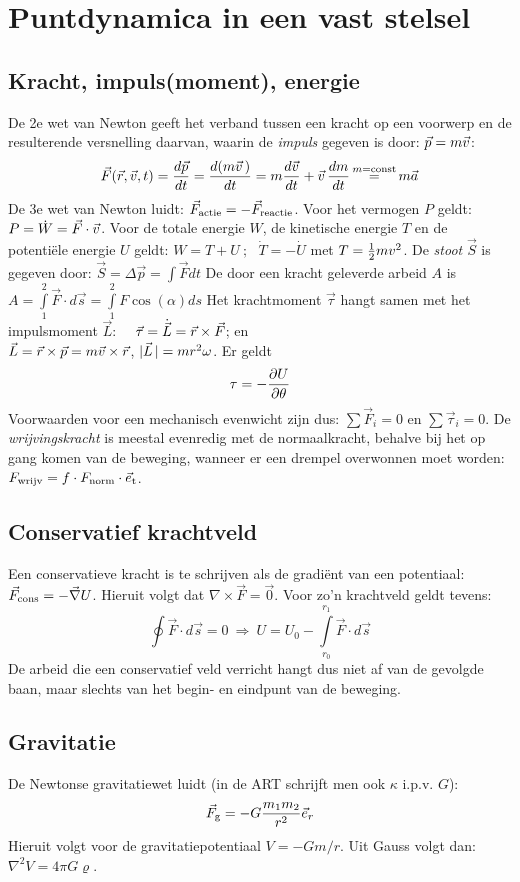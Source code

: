 \section{Puntdynamica in een vast stelsel}
\subsection{Kracht, impuls(moment), energie}
De 2e wet van Newton geeft het verband tussen een kracht op een voorwerp en
de resulterende versnelling daarvan, waarin de {\it impuls} gegeven is door:
$\vec{p}=m\vec{v}$:
\[
\vec{F}(\vec{r},\vec{v},t)=\frac{d\vec{p}}{dt}=\frac{d(m\vec{v}\,)}{dt}=m\frac{d\vec{v}}{dt}+
\vec{v}\,\frac{dm}{dt}\mathop{=}\limits^{m={\rm const}}m\vec{a}
\]
De 3e wet van Newton luidt: $\vec{F}_{\rm actie}=-\vec{F}_{\rm reactie}$.
\npar
Voor het vermogen $P$ geldt: $P=\dot{W}=\vec{F}\cdot\vec{v}$. Voor de totale
energie $W$, de kinetische energie $T$ en de potenti\"ele energie $U$ geldt:
$W=T+U~;~~~\dot{T}=-\dot{U}$ met $T=\mbox{$\frac{1}{2}$} mv^2$.
\npar
De {\it stoot} $\vec{S}$ is gegeven door:
$\displaystyle\vec{S}=\Delta\vec{p}=\int\vec{F}dt$
\npar
De door een kracht geleverde arbeid $A$ is
$\displaystyle A=\int\limits_1^2\vec{F}\cdot d\vec{s}=\int\limits_1^2F\cos(\alpha)ds$
\npar
Het krachtmoment $\vec{\tau}$ hangt samen met het impulsmoment $\vec{L}$:~~
$\vec{\tau}=\dot{\vec{L}}=\vec{r}\times\vec{F}$; en\\
$\vec{L}=\vec{r}\times\vec{p}=m\vec{v}\times\vec{r}$, $|\vec{L}\,|=mr^2\omega$. Er geldt
\[
\tau=-\frac{\partial U}{\partial \theta}
\]
Voorwaarden voor een mechanisch evenwicht zijn dus: $\sum\vec{F}_i=0$ en
$\sum\vec{\tau}_i=0$.
\npar
De {\it wrijvingskracht} is meestal evenredig met de normaalkracht, behalve
bij het op gang komen van de beweging, wanneer er een drempel overwonnen
moet worden: $F_{\rm wrijv}=f\cdot F_{\rm norm}\cdot\vec{e}_{\rm t}$.

\subsection{Conservatief krachtveld}
Een conservatieve kracht is te schrijven als de gradi\"ent van een potentiaal:
$\vec{F}_{\rm cons}=-\vec{\nabla}U$. Hieruit volgt dat
$\nabla\times\vec{F}=\vec{0}$. Voor zo'n krachtveld geldt tevens:
\[
\oint\vec{F}\cdot d\vec{s}=0~\Rightarrow~U=U_0-\int\limits_{r_0}^{r_1}\vec{F}\cdot d\vec{s}
\]
De arbeid die een conservatief veld verricht hangt dus niet af van de
gevolgde baan, maar slechts van het begin- en eindpunt van de beweging.

\subsection{Gravitatie}
De Newtonse gravitatiewet luidt (in de ART schrijft men ook $\kappa$ i.p.v. $G$):
\[
\vec{F}_{\rm g}=-G\frac{m_1 m_2}{r^2}\vec{e}_{r}
\]
Hieruit volgt voor de gravitatiepotentiaal $V=-Gm/r$. Uit Gauss volgt dan:
$\nabla^2 V=4\pi G\varrho$.

